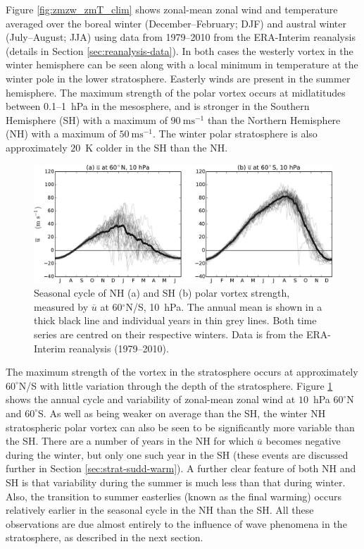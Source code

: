 Figure \ref{fig:zmzw_zmT_clim} shows zonal-mean zonal wind and temperature
averaged over the boreal winter (December--February; DJF) and austral winter
(July--August; JJA) using data from 1979--2010 from the ERA-Interim reanalysis
(details in Section \ref{sec:reanalysis-data}). In both cases the westerly
vortex in the winter hemisphere can be seen along with a local minimum in
temperature at the winter pole in the lower stratosphere. Easterly winds are
present in the summer hemisphere. The maximum strength of the polar vortex
occurs at midlatitudes between 0.1--1~hPa in the mesosphere, and is stronger in
the Southern Hemisphere (SH) with a maximum of $90~\mathrm{ms^{-1}}$ than the
Northern Hemisphere (NH) with a maximum of $50~\mathrm{ms^{-1}}$. The winter
polar stratosphere is also approximately $20$~K colder in the SH than the NH.

\begin{figure}
 \centering
 \noindent\includegraphics[width=\textwidth]{figures/chapter-intro/zmzw_NH_SH.pdf}
 \caption[Comparison of NH and SH polar vortex seasonal cycle.]{Seasonal cycle
   of NH (a) and SH (b) polar vortex strength, measured by $\overline{u}$ at
   60$^{\circ}$N/S, 10~hPa. The annual mean is shown in a thick black line and
   individual years in thin grey lines. Both time series are centred on their
   respective winters. Data is from the ERA-Interim reanalysis (1979--2010).}
 \label{fig:zmzw_NH_SH}
\end{figure}

The maximum strength of the vortex in the stratosphere occurs at approximately
$60^{\circ}$N/S with little variation through the depth of the
stratosphere. Figure \ref{fig:zmzw_NH_SH} shows the annual cycle and variability
of zonal-mean zonal wind at $10$~hPa $60^{\circ}$N and $60^{\circ}$S. As well as
being weaker on average than the SH, the winter NH stratospheric polar vortex
can also be seen to be significantly more variable than the SH. There are a
number of years in the NH for which $\overline{u}$ becomes negative during the
winter, but only one such year in the SH (these events are discussed further in
Section \ref{sec:strat-sudd-warm}). A further clear feature of both NH and SH is
that variability during the summer is much less than that during winter. Also,
the transition to summer easterlies (known as the final warming) occurs
relatively earlier in the seasonal cycle in the NH than the SH. All these
observations are due almost entirely to the influence of wave phenomena in the
stratosphere, as described in the next section.


